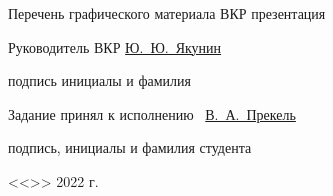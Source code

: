 \begin{spacing}{1}
{        {\hfill}

        {\hfill}

        Перечень графического материала ВКР {презентация\hfill}

        {\hfill}

        {\hfill}

        {\hfill}

        \vfill

        Руководитель ВКР
        \hfill
        \uline{\hspace{10.5ex}}
        \hspace{6ex}
        \uline{Ю.~Ю.~Якунин}

        \vspace{-4pt}

        \hfill
        {\footnotesize подпись}
        \hspace{8.5ex}
        {\footnotesize инициалы и фамилия}

        Задание принял к исполнению~
        \hfill
        \uline{\hspace{18.5ex}В.~А.~Прекель}

        \vspace{-4pt}

        \hfill
        {\footnotesize подпись, инициалы и фамилия студента}

        \vspace{1em}

        \hfill <<\uline{\hspace{3ex}}>> \uline{\hspace{9ex}} 2022 г.
    }
\end{spacing}

\thispagestyle{empty}

\clearpage
